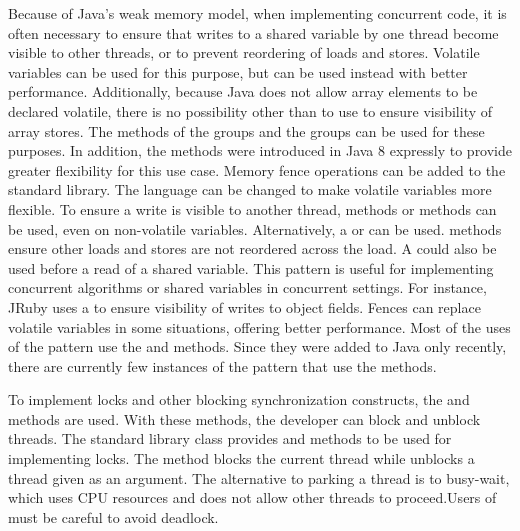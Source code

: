%
{Because of Java's weak memory
  model, when implementing concurrent code,
  it is often necessary to ensure that
  writes to a shared variable by one thread become visible to other threads,
  or to prevent
  reordering of loads and stores.
  Volatile variables can be used for this purpose, but
  \smu{} can be used instead with better performance.
  Additionally, because Java does not allow array elements to be declared volatile,
  there is no possibility other than to use \unsafe{} to ensure visibility of
  array stores. The methods of the  groups
  and the  groups can be used for these purposes.
  In addition, the  methods were introduced in Java 8 expressly
to provide greater flexibility for this use case.}
{Memory fence operations can be added to the standard library. The language
can be changed to make volatile variables more flexible.}
{To ensure a write is visible to another thread, 
  methods or  methods can be used, even on non-volatile variables.
  Alternatively, a  or  can be used.
   methods ensure other loads and stores are not reordered
  across the load. A  could also be used before a read of a
  shared variable.
}{This pattern is useful for implementing concurrent algorithms or shared
  variables in concurrent settings. For instance, JRuby uses a 
  to ensure visibility of writes to object fields.
}{Fences can replace volatile variables in some situations, offering better
  performance. Most of the uses of the pattern use the 
  and  methods. Since they were added to Java only recently, there are currently few instances
of the pattern that use the  methods.}

\newcommand\foundinpark{62}
\newcommand\usedbypark{7330}
\newcommand\mostusedpark{\parkmost}
\newcommand\memberspark{\member{park}, \member{unpark}}
\newcommand\namepark{Park/Unpark Threads}


%
{
To implement locks and other blocking synchronization constructs,
the  and  methods are used.
With these methods, the developer can block and unblock threads.
}
{The standard library class  provides  and 
methods to be used for implementing locks.}
{The  method blocks the current thread while 
unblocks a thread given as an argument.}
{The alternative to parking a thread is to busy-wait, which uses CPU
resources and does not allow other threads to proceed.}{Users of
   must be careful to avoid deadlock.}

